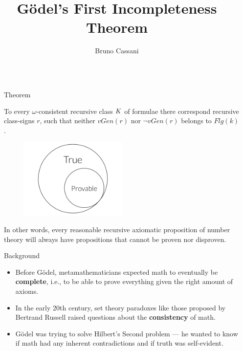 \documentclass[final]{beamer}
\title{Gödel's First Incompleteness Theorem}
\author{Bruno Cassani}
\institute[shortinst]{\textbf{Morrissey College of Arts and Sciences}, Boston College}
\newlength{\sepwidth}
\newlength{\colwidth}
\newcommand{\separatorcolumn}{\begin{column}{\sepwidth}\end{column}}
\begin{document}
\begin{frame}[t]
\begin{columns}[t]
\separatorcolumn

\begin{column}{\colwidth}



  \begin{alertblock}{Theorem}

    To every $\omega$-consistent recursive class $\small{K}$ of formulae there correspond recursive class-signs $r$, such that neither $vGen(r)$ nor $\neg vGen(r)$ belongs to $Flg(k)$.

    \begin{figure}
      \centering
            \includegraphics[width=0.5\textwidth]{figures/Draw_1.png}
    \end{figure}

    In other words, every reasonable recursive axiomatic proposition of number theory will always have propositions that cannot be proven nor disproven.
    
  \end{alertblock}
  
\begin{block}{Background}

    \begin{itemize}
      \item Before Gödel, metamathematicians expected math to eventually be \textbf{complete}, i.e., to be able to prove everything given the right amount of axioms.
      \item In the early 20th century, set theory paradoxes like those proposed by Bertrand Russell raised questions about the \textbf{consistency} of math.
      \item Gödel was trying to solve Hilbert's Second problem — he wanted to know if math had any inherent contradictions and if truth was self-evident.
        
    \end{itemize}


\end{block}
\end{column}
\end{columns}
\end{frame}
\end{document}
